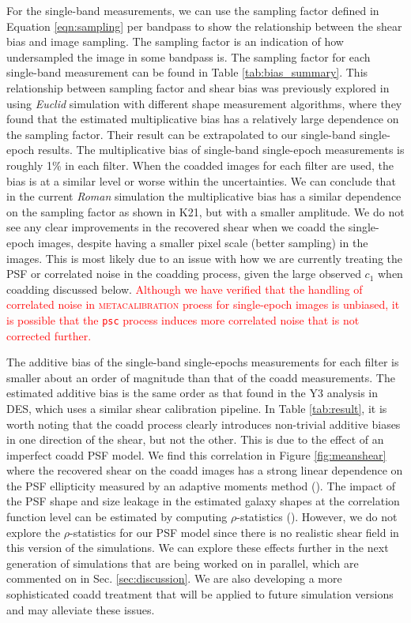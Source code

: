\documentclass[fleqn,usenatbib]{mnras}
\begin{document}
For the single-band measurements, we can use the sampling factor defined in Equation \ref{eqn:sampling} per bandpass to show the relationship between the shear bias and image sampling. The sampling factor is an indication of how undersampled the image in some bandpass is. The sampling factor for each single-band measurement can be found in Table \ref{tab:bias_summary}. This relationship between sampling factor and shear bias was previously explored in \citealt{2021MNRAS.502.4048K} using \emph{Euclid} simulation with different shape measurement algorithms, where they found that the estimated multiplicative bias has a relatively large dependence on the sampling factor. Their result can be extrapolated to our single-band single-epoch results. The multiplicative bias of single-band single-epoch measurements is roughly 1\% in each filter. When the coadded images for each filter are used, the bias is at a similar level or worse within the uncertainties. We can conclude that in the current \emph{Roman} simulation the multiplicative bias has a similar dependence on the sampling factor as shown in K21, but with a smaller amplitude. We do not see any clear improvements in the recovered shear when we coadd the single-epoch images, despite having a smaller pixel scale (better sampling) in the images. This is most likely due to an issue with how we are currently treating the PSF or correlated noise in the coadding process, given the large observed $c_1$ when coadding discussed below. \textcolor{red}{Although we have verified that the handling of correlated noise in \textsc{metacalibration} proess for single-epoch images is unbiased, it is possible that the \texttt{psc} process induces more correlated noise that is not corrected further. }

The additive bias of the single-band single-epochs measurements for each filter is smaller about an order of magnitude than that of the coadd measurements. The estimated additive bias is the same order as that found in the Y3 analysis in DES, which uses a similar shear calibration pipeline. In Table \ref{tab:result}, it is worth noting that the coadd process clearly introduces non-trivial additive biases in one direction of the shear, but not the other. This is due to the effect of an imperfect coadd PSF model. We find this correlation in Figure \ref{fig:meanshear} where the recovered shear on the coadd images has a strong linear dependence on the PSF ellipticity measured by an adaptive moments method (\citealt{2003MNRAS.343..459H}). The impact of the PSF shape and size leakage in the estimated galaxy shapes at the correlation function level can be estimated by computing $\rho$-statistics (\citealt{2008A&A...484...67P, 2010MNRAS.404..350R, 2016MNRAS.460.2245J}). However, we do not explore the $\rho$-statistics for our PSF model since there is no realistic shear field in this version of the simulations. We can explore these effects further in the next generation of simulations that are being worked on in parallel, which are commented on in Sec. \ref{sec:discussion}. We are also developing a more sophisticated coadd treatment that will be applied to future simulation versions and may alleviate these issues.
\end{document}
